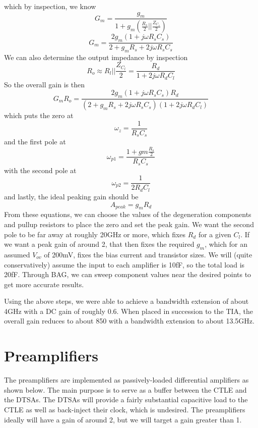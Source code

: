 which by inspection, we know
\begin{equation}
\label{Gm}
G_m=\frac{g_m}{1+g_m(\frac{R_s}{2}||\frac{Z_{C_s}}{2})}
\end{equation}
\begin{equation}
G_m=\frac{2g_m(1+j\omega R_sC_s)}{2+g_mR_s+2j\omega R_sC_s}
\end{equation}
We can also determine the output impedance by inspection
\begin{equation}
\label{Ro}
R_o\approx R_l||\frac{Z_{C_l}}{2}=\frac{R_d}{1+2j\omega R_d C_l}
\end{equation}
So the overall gain is then
\begin{equation}
\label{ctle_gain}
G_mR_o=\frac{2g_m(1+j\omega R_sC_s)R_d}{(2+g_m R_s+2j\omega R_sC_s)(1+2j\omega R_dC_l)}
\end{equation}
which puts the zero at 
\begin{equation}
\label{zero}
\omega_z=\frac{1}{R_sC_s}
\end{equation}
and the first pole at 
\begin{equation}
\label{pole_1}
\omega_{p1}=\frac{1+gm\frac{R_s}{2}}{R_sC_s}
\end{equation}
with the second pole at
\begin{equation}
\label{pole_2}
\omega_{p2}=\frac{1}{2R_dC_l}
\end{equation}
and lastly, the ideal peaking gain should be 
\begin{equation}
\label{peak gain}
A_{peak}=g_mR_d
\end{equation}
From these equations, we can choose the values of the degeneration components and pullup resistors to place the zero and set the peak gain. We want the second pole to be far away at roughly 20GHz or more, which fixes $R_d$ for a given $C_l$. If we want a peak gain of around 2, that then fixes the required $g_m$, which for an assumed $V_{ov}$ of 200mV, fixes the bias current and transistor sizes. We will (quite conservatively) assume the input to each amplifier is 10fF, so the total load is 20fF. Through BAG, we can sweep component values near the desired points to get more accurate results.

Using the above steps, we were able to achieve a bandwidth extension of about 4GHz with a DC gain of roughly 0.6. When placed in succession to the TIA, the overall gain reduces to about 850 with a bandwidth extension to about 13.5GHz.

\section{Preamplifiers}
The preamplifiers are implemented as passively-loaded differential amplifiers as shown below. The main purpose is to serve as a buffer between the CTLE and the DTSAs. The DTSAs will provide a fairly substantial capacitive load to the CTLE as well as back-inject their clock, which is undesired. The preamplifiers ideally will have a gain of around 2, but we will target a gain greater than 1. 

